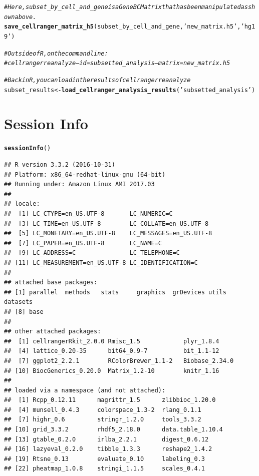\documentclass[10pt,oneside]{article}\usepackage[]{graphicx}\usepackage[]{color}
\makeatletter
\newcommand{\hlstr}[1]{\textcolor[rgb]{0.192,0.494,0.8}{#1}}%
\newcommand{\hlcom}[1]{\textcolor[rgb]{0.678,0.584,0.686}{\textit{#1}}}%
\newcommand{\hlstd}[1]{\textcolor[rgb]{0.345,0.345,0.345}{#1}}%
\newcommand{\hlkwb}[1]{\textcolor[rgb]{0.69,0.353,0.396}{#1}}%
\newcommand{\hlkwd}[1]{\textcolor[rgb]{0.737,0.353,0.396}{\textbf{#1}}}%
\newenvironment{kframe}{%
 \def\at@end@of@kframe{}%
 \ifinner\ifhmode%
  \def\at@end@of@kframe{\end{minipage}}%
  \begin{minipage}{\columnwidth}%
 \fi\fi%
 \def\FrameCommand##1{\hskip\@totalleftmargin \hskip-\fboxsep
 \colorbox{shadecolor}{##1}\hskip-\fboxsep
     \hskip-\linewidth \hskip-\@totalleftmargin \hskip\columnwidth}%
 \MakeFramed {\advance\hsize-\width
   \@totalleftmargin\z@ \linewidth\hsize
   \@setminipage}}%
 {\par\unskip\endMakeFramed%
 \at@end@of@kframe}
\newenvironment{knitrout}{}{} %
\makeatother
\begin{document}
\begin{knitrout}
\color{fgcolor}\begin{kframe}
\begin{alltt}
\hlcom{# Here, subset_by_cell_and_gene is a GeneBCMatrix that has been manipulated as shown above.}
\hlkwd{save_cellranger_matrix_h5}\hlstd{(subset_by_cell_and_gene,} \hlstr{'new_matrix.h5'}\hlstd{,} \hlstr{'hg19'}\hlstd{)}

\hlcom{# Outside of R, on the command line:}
\hlcom{# cellranger reanalyze --id=subsetted_analysis --matrix=new_matrix.h5}

\hlcom{# Back in R, you can load in the results of cellranger reanalyze}
\hlstd{subset_results} \hlkwb{<-} \hlkwd{load_cellranger_analysis_results}\hlstd{(}\hlstr{'subsetted_analysis'}\hlstd{)}
\end{alltt}
\end{kframe}
\end{knitrout}


\section{Session Info}
\begin{knitrout}
\color{fgcolor}\begin{kframe}
\begin{alltt}
\hlkwd{sessionInfo}\hlstd{()}
\end{alltt}
\begin{verbatim}
## R version 3.3.2 (2016-10-31)
## Platform: x86_64-redhat-linux-gnu (64-bit)
## Running under: Amazon Linux AMI 2017.03
## 
## locale:
##  [1] LC_CTYPE=en_US.UTF-8       LC_NUMERIC=C              
##  [3] LC_TIME=en_US.UTF-8        LC_COLLATE=en_US.UTF-8    
##  [5] LC_MONETARY=en_US.UTF-8    LC_MESSAGES=en_US.UTF-8   
##  [7] LC_PAPER=en_US.UTF-8       LC_NAME=C                 
##  [9] LC_ADDRESS=C               LC_TELEPHONE=C            
## [11] LC_MEASUREMENT=en_US.UTF-8 LC_IDENTIFICATION=C       
## 
## attached base packages:
## [1] parallel  methods   stats     graphics  grDevices utils     datasets 
## [8] base     
## 
## other attached packages:
##  [1] cellrangerRkit_2.0.0 Rmisc_1.5            plyr_1.8.4          
##  [4] lattice_0.20-35      bit64_0.9-7          bit_1.1-12          
##  [7] ggplot2_2.2.1        RColorBrewer_1.1-2   Biobase_2.34.0      
## [10] BiocGenerics_0.20.0  Matrix_1.2-10        knitr_1.16          
## 
## loaded via a namespace (and not attached):
##  [1] Rcpp_0.12.11      magrittr_1.5      zlibbioc_1.20.0  
##  [4] munsell_0.4.3     colorspace_1.3-2  rlang_0.1.1      
##  [7] highr_0.6         stringr_1.2.0     tools_3.3.2      
## [10] grid_3.3.2        rhdf5_2.18.0      data.table_1.10.4
## [13] gtable_0.2.0      irlba_2.2.1       digest_0.6.12    
## [16] lazyeval_0.2.0    tibble_1.3.3      reshape2_1.4.2   
## [19] Rtsne_0.13        evaluate_0.10     labeling_0.3     
## [22] pheatmap_1.0.8    stringi_1.1.5     scales_0.4.1
\end{verbatim}
\end{kframe}
\end{knitrout}



\end{document}
